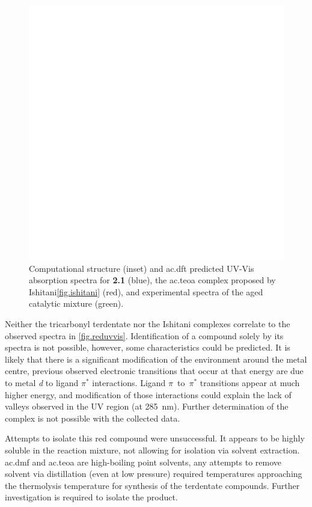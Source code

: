 \begin{figure}[!htbp]
 \begin{center}
  \includegraphics[clip=true, keepaspectratio, width=120mm]{images/ishitani.eps}
 \end{center}
\caption[Structure and absorption spectra of the catalyst-TEOA complex.]{Computational structure (inset) and \gls{ac.dft} predicted UV-Vis absorption spectra for \textbf{2.1} (blue), the \gls{ac.teoa} complex proposed by Ishitani\autoref{fig.ishitani} (red), and experimental spectra of the aged catalytic mixture (green).}
\label{fig.ishitani}
\end{figure}

Neither the tricarbonyl terdentate nor the Ishitani complexes correlate to the observed spectra in \autoref{fig.reduvvis}. Identification of a compound solely by its spectra is not possible, however, some characteristics could be predicted. It is likely that there is a significant modification of the environment around the metal centre, previous observed electronic transitions that occur at that energy are due to metal \textit{d} to ligand $\pi^\ast$ interactions. Ligand $\pi$~to~$\pi^\ast$ transitions appear at much higher energy, and modification of those interactions could explain the lack of valleys observed in  the UV region (at 285~nm). Further determination of the complex is not possible with the collected data.

Attempts to isolate this red compound were unsuccessful. It appears to be highly soluble in the reaction mixture, not allowing for isolation via solvent extraction.  \Gls{ac.dmf} and \gls{ac.teoa} are high-boiling point solvents, any attempts to remove solvent via distillation (even at low pressure) required temperatures approaching the thermolysis temperature for synthesis of the terdentate compounds. Further investigation is required to isolate the product.

